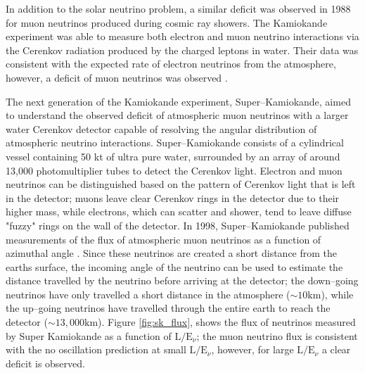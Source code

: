 In addition to the solar neutrino problem, a similar deficit was observed in
1988 for muon neutrinos produced during cosmic ray showers.  The Kamiokande 
experiment was able to measure both electron and muon neutrino interactions 
via the Cerenkov radiation produced by the charged leptons in water. Their 
data was consistent with the expected rate of electron neutrinos from the 
atmosphere, however, a deficit of muon neutrinos was observed 
\cite{Hirata1988}. 

The next generation of the Kamiokande experiment, Super--Kamiokande, aimed to
understand the observed deficit of atmospheric muon neutrinos with a larger 
water Cerenkov detector capable of resolving the angular distribution of 
atmospheric neutrino interactions. Super--Kamiokande consists of a cylindrical 
vessel containing 50 kt of ultra pure water, surrounded by an array of around 
13,000 photomultiplier tubes to detect the Cerenkov light. Electron and muon 
neutrinos can be distinguished based on the pattern of Cerenkov light that is 
left in the detector; muons leave clear Cerenkov rings in the detector due to 
their higher mass, while electrons, which can scatter and shower, tend to leave 
diffuse "fuzzy" rings on the wall of the detector. In 1998, Super--Kamiokande 
published measurements of the flux of atmospheric muon neutrinos as a function 
of azimuthal angle \cite{Fukuda1998}. Since these neutrinos are created a 
short distance from the earths surface, the incoming angle of the neutrino can 
be used to estimate the distance travelled by the neutrino before arriving at 
the detector; the down--going neutrinos have only travelled a short distance in 
the atmosphere (\(\sim 10 \mbox{km}\)), while the up--going neutrinos have 
travelled through the entire earth to reach the detector 
(\(\sim 13,000 \mbox{km}\)). Figure \ref{fig:sk_flux}, shows the flux of 
neutrinos measured by Super Kamiokande as a function of 
\(\mbox{L} / \mbox{E}_\nu\); the muon neutrino flux is consistent with the no 
oscillation prediction at small \(\mbox{L} / \mbox{E}_\nu\), however, for 
large \(\mbox{L} / \mbox{E}_\nu\) a clear deficit is observed. 

